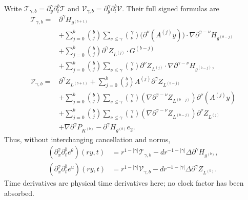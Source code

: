 Write $\mathcal T_{\gamma,b}=\partial_y^\gamma\partial_t^b\mathcal T$
and $\mathcal V_{\gamma,b}=\partial_y^\gamma\partial_t^b\mathcal V$.
Their full signed formulas are
\begin{align}
 \mathcal T_{\gamma,b}
 ={}&\partial^\gamma H_{g^{(b+1)}}\nonumber\\
 &+\sum_{j=0}^b\binom bj\sum_{\nu\leq\gamma}\binom\gamma\nu
   \bigl(\partial^\nu(A^{(j)}y)\bigr)\cdot
          \nabla\partial^{\gamma-\nu}H_{g^{(b-j)}}\nonumber\\
 &+\sum_{j=0}^b\binom bj
       \partial^\gamma Z_{L^{(j)}}\cdot G^{(b-j)}\nonumber\\
 &+\sum_{j=0}^b\binom bj\sum_{\nu\leq\gamma}\binom\gamma\nu
       \partial^\nu Z_{L^{(j)}}\cdot
          \nabla\partial^{\gamma-\nu}H_{g^{(b-j)}},
 \label{cvlane:ifs:scalar-jets}\\
 \mathcal V_{\gamma,b}
 ={}&\partial^\gamma Z_{L^{(b+1)}}
       +\sum_{j=0}^b\binom bj A^{(j)}
                            \partial^\gamma Z_{L^{(b-j)}}\nonumber\\
 &+\sum_{j=0}^b\binom bj\sum_{\nu\leq\gamma}\binom\gamma\nu
       (\nabla\partial^{\gamma-\nu} Z_{L^{(b-j)}})
                              \partial^\nu(A^{(j)}y)\nonumber\\
 &+\sum_{j=0}^b\binom bj\sum_{\nu\leq\gamma}\binom\gamma\nu
       (\nabla\partial^{\gamma-\nu} Z_{L^{(b-j)}})
                              \partial^\nu Z_{L^{(j)}}\nonumber\\
 &+\nabla\partial^\gamma P_{K^{(b)}}
       -\partial^\gamma H_{g^{(b)}}e_2.
 \label{cvlane:ifs:vector-jets}
\end{align}
Thus, without interchanging cancellation and norms,
\begin{align}
 (\partial_x^\gamma\partial_t^b e^\theta)(ry,t)
 &=r^{1-|\gamma|}\mathcal T_{\gamma,b}
    -d r^{-1-|\gamma|}\Delta\partial^\gamma H_{g^{(b)}},
 \label{cvlane:ifs:physical-scalar-jets}\\
 (\partial_x^\gamma\partial_t^b e^u)(ry,t)
 &=r^{1-|\gamma|}\mathcal V_{\gamma,b}
    -d r^{-1-|\gamma|}\Delta\partial^\gamma Z_{L^{(b)}}.
 \label{cvlane:ifs:physical-vector-jets}
\end{align}
Time derivatives are physical time derivatives here; no clock
factor has been absorbed.

